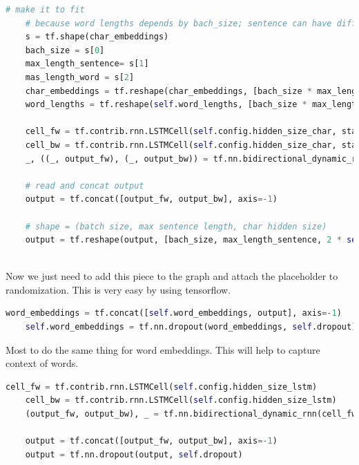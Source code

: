 \begin{lstlisting}[language=Python,caption={Apply bi-LSTM to char embeddings}]
    # make it to fit
    # because word lengths depends by bach_size; sentence can have different lengths
    s = tf.shape(char_embeddings)
    bach_size = s[0]
    max_length_sentence= s[1]
    mas_length_word = s[2]
    char_embeddings = tf.reshape(char_embeddings, [bach_size * max_length_sentence, mas_length_word, self.config.dim_char], "char_embeddings")
    word_lengths = tf.reshape(self.word_lengths, [bach_size * max_length_sentence], "word_lengths")

    cell_fw = tf.contrib.rnn.LSTMCell(self.config.hidden_size_char, state_is_tuple=True)
    cell_bw = tf.contrib.rnn.LSTMCell(self.config.hidden_size_char, state_is_tuple=True)
    _, ((_, output_fw), (_, output_bw)) = tf.nn.bidirectional_dynamic_rnn(cell_fw, cell_bw, char_embeddings, sequence_length=word_lengths, dtype=tf.float32)

    # read and concat output
    output = tf.concat([output_fw, output_bw], axis=-1)

    # shape = (batch size, max sentence length, char hidden size)
    output = tf.reshape(output, [bach_size, max_length_sentence, 2 * self.config.hidden_size_char], "output")
        
\end{lstlisting}

Now we just need to add this piece to the graph and attach the placeholder to randomization. This is very easy by using tensorflow.

\begin{lstlisting}[language=Python,caption={Randomize the word embeddings}]
    word_embeddings = tf.concat([self.word_embeddings, output], axis=-1)
    self.word_embeddings = tf.nn.dropout(word_embeddings, self.dropout)   
\end{lstlisting}

Most to do the same thing for word embeddings. This will help to capture context of words.

\begin{lstlisting}[language=Python,caption={Apply bi-LSTM to word embeddings}]
    cell_fw = tf.contrib.rnn.LSTMCell(self.config.hidden_size_lstm)
    cell_bw = tf.contrib.rnn.LSTMCell(self.config.hidden_size_lstm)
    (output_fw, output_bw), _ = tf.nn.bidirectional_dynamic_rnn(cell_fw, cell_bw, self.word_embeddings, sequence_length=self.sequence_lengths, dtype=tf.float32)
    
    output = tf.concat([output_fw, output_bw], axis=-1)
    output = tf.nn.dropout(output, self.dropout)
        
\end{lstlisting}

